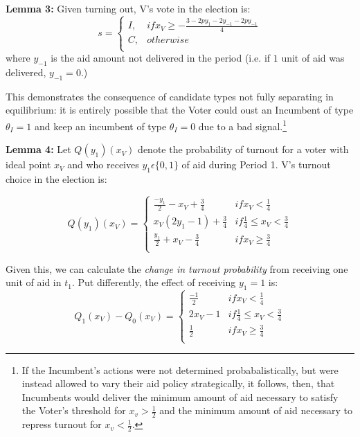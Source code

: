\documentclass[12pt]{paper}
\begin{document}
\textbf{Lemma 3:}
Given turning out, V’s vote in the election is:
\begin{equation}
s =
\begin{cases}
I, & if x_V \geq -\frac{3 - 2py_1 - 2y_{-1} - 2py_{-1}}{4} \\    
C,     & otherwise  \\
\end{cases}
\end{equation}
where $y_{-1}$ is the aid amount not delivered in the period (i.e. if $1$ unit of aid was delivered, $y_{-1} = 0$.) 

This demonstrates the consequence of candidate types not fully separating in equilibrium: it is entirely possible that the Voter could oust an Incumbent of type $\theta_I = 1$ and keep an incumbent of type $\theta_I = 0$ due to a bad signal.\footnote{If the Incumbent's actions were not determined probabalistically, but were instead allowed to vary their aid policy strategically, it follows, then, that Incumbents would deliver the minimum amount of aid necessary to satisfy the Voter's threshold for $x_v > \frac{1}{2}$ and the minimum amount of aid necessary to repress turnout for $x_v < \frac{1}{2}$.}


\textbf{Lemma 4:} Let $Q(y_1 )(x_V )$ denote the probability of turnout for a voter with ideal point $x_V$ and who receives $y_1 \epsilon \{0,1\}$ of aid during Period 1. V’s turnout choice in the election is:

\begin{equation}
Q(y_1 )(x_V ) =
\begin{cases}
\frac{-y_1}{2} - x_V + \frac{3}{4} & if x_V < \frac{1}{4}\\    
x_V (2y_1 - 1) + \frac{3}{4}     & if \frac{1}{4} \leq x_V < \frac{3}{4}  \\
\frac{y_1}{2} + x_V - \frac{3}{4}     & if x_V \geq \frac{3}{4}  \\
\end{cases}
\end{equation}

Given this, we can calculate the \emph{change in turnout probability} from receiving one unit of aid in $t_1$. Put differently, the effect of receiving $y_1 = 1$ is:
\begin{equation}
Q_1 (x_V ) - Q_0 (x_V )=
\begin{cases}
\frac{-1}{2} & if x_V < \frac{1}{4}\\    
2x_V - 1 & if \frac{1}{4} \leq x_V < \frac{3}{4}  \\
\frac{1}{2} & if x_V \geq \frac{3}{4}  \\
\end{cases}
\end{equation}
\end{document}
